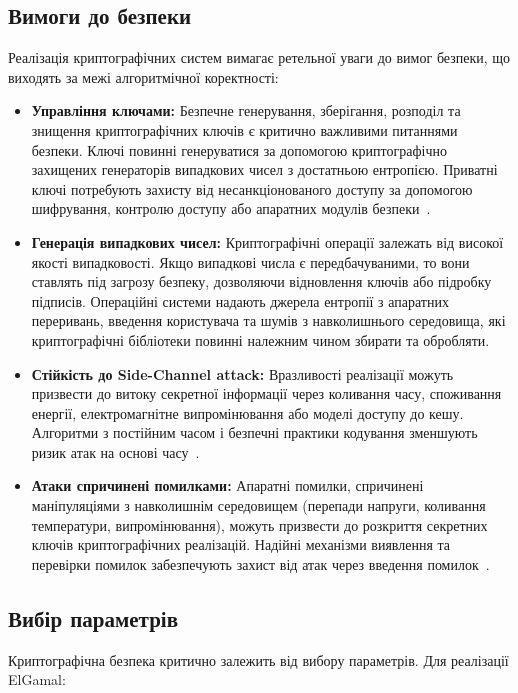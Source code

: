 \subsection{Вимоги до безпеки}

Реалізація криптографічних систем вимагає ретельної уваги до вимог безпеки, що виходять за межі алгоритмічної коректності:
\begin{itemize}
    \item \textbf{Управління ключами:} Безпечне генерування, зберігання, розподіл та знищення криптографічних ключів 
        є критично важливими питаннями безпеки. Ключі повинні генеруватися за допомогою криптографічно захищених генераторів 
        випадкових чисел з достатньою ентропією. Приватні ключі потребують захисту від несанкціонованого доступу за допомогою 
        шифрування, контролю доступу або апаратних модулів безпеки~\cite{ferguson2010}.
    \item \textbf{Генерація випадкових чисел:} Криптографічні операції залежать від високої якості випадковості. 
        Якщо випадкові числа є передбачуваними, то вони ставлять під загрозу безпеку, дозволяючи відновлення 
        ключів або підробку підписів. Операційні системи надають джерела ентропії з апаратних переривань, введення 
        користувача та шумів з навколишнього середовища, які криптографічні бібліотеки повинні належним чином збирати 
        та обробляти.
    \item \textbf{Стійкість до Side-Channel attack:} 
        Вразливості реалізації можуть призвести до витоку секретної інформації через коливання часу, споживання енергії, 
        електромагнітне випромінювання або моделі доступу до кешу. Алгоритми з постійним часом і безпечні практики 
        кодування зменшують ризик атак на основі часу~\cite{kocher1996}.
    \item \textbf{Атаки спричинені помилками:} Апаратні помилки, спричинені маніпуляціями з навколишнім середовищем 
        (перепади напруги, коливання температури, випромінювання), можуть призвести до розкриття секретних ключів 
        криптографічних реалізацій. Надійні механізми виявлення та перевірки помилок забезпечують захист від атак 
        через введення помилок~\cite{boneh1997}.
\end{itemize}

\subsection{Вибір параметрів}

Криптографічна безпека критично залежить від вибору параметрів. Для реалізації ElGamal:

